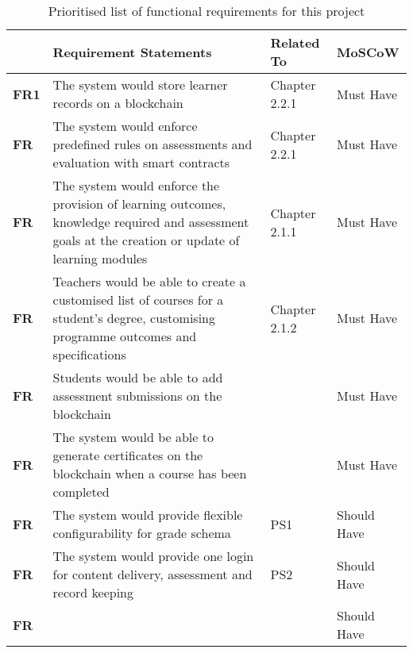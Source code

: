\begin{table}[!h] 
    \caption{Prioritised list of functional requirements for this project}
    \centering
    \label{table:formal-reqs}
    \begin{tabularx}{\textwidth}{>{\bfseries}lXll}
        & Requirement Statements & Related To & MoSCoW\\
        \toprule
        FR1 & The system would store learner records on a blockchain 
        & Chapter 2.2.1 & Must Have\\\midrule
        FR & The system would enforce predefined rules on assessments and evaluation with 
        smart contracts & Chapter 2.2.1 & Must Have\\\midrule
        FR & The system would enforce the provision of learning outcomes, knowledge required 
        and assessment goals at the creation or update of learning modules & Chapter 2.1.1
        & Must Have\\\midrule
        FR & Teachers would be able to create a customised list of courses for a student's degree,
        customising programme outcomes and specifications 
        & Chapter 2.1.2 & Must Have\\\midrule
        FR & Students would be able to add assessment submissions on the blockchain 
        &  & Must Have\\\midrule
        FR & The system would be able to generate certificates on the blockchain when a course 
        has been completed &  & Must Have\\\midrule
        FR & The system would provide flexible configurability for grade schema & PS1
        & Should Have\\\midrule
        FR & The system would provide one login for content delivery, assessment and 
        record keeping & PS2 & Should Have\\\midrule
        FR &  &  & Should Have\\
        \bottomrule
    \end{tabularx}
\end{table}